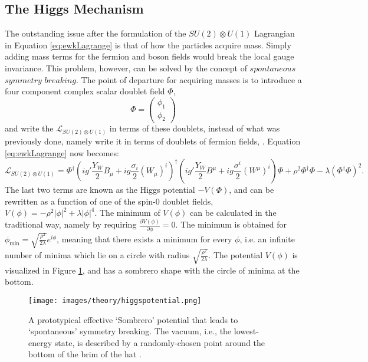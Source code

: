 \subsection*{The Higgs Mechanism}\label{sec:higgs}
\noindent\justify 
The outstanding issue after the formulation of the $SU(2)\otimes U(1)$ Lagrangian in Equation \ref{eq:ewkLagrange} is that of how the particles acquire mass. 
Simply adding mass terms for the fermion and boson fields would break the local gauge invariance. 
This problem, however, can be solved by the concept of $spontaneous$ $symmetry$ $breaking$. 
The point of departure for acquiring masses is to introduce a four component complex scalar doublet field $\Phi$,
\begin{equation}
\Phi=\begin{pmatrix} \phi_{1}\\ \phi_{2}\end{pmatrix}
\end{equation}
and write the $\mathcal{L}_{SU(2)\otimes U(1)}$ in terms of these doublets, instead of what was previously done, namely write it in terms of doublets of fermion fields, \cite{Kane:2244793}.  
Equation \ref{eq:ewkLagrange} now becomes:
\begin{equation}
\mathcal{L}_{SU(2)\otimes U(1)}=
\Phi^{\dagger}\left( ig'\frac{Y_{W}}{2}B_{\mu}+ig\frac{\sigma_{i}}{2}(W_{\mu})^{i}\right)^{\dagger}\left(ig'\frac{Y_{W}}{2}B^{\mu}+ig\frac{\sigma^{i}}{2}(W^{\mu})^{i}\right)\Phi
+\rho^{2}\Phi^{\dagger}\Phi-\lambda(\Phi^{\dagger}\Phi)^{2}. 
\label{eq:higgsPotential}
\end{equation}
The last two terms are known as the Higgs potential $-V(\Phi)$, and can be rewritten as a function of one of the spin-0 doublet fields, $V(\phi)=-\rho^{2}|\phi|^{2}+\lambda|\phi|^{4}$. 
The minimum of $V(\phi)$ can be calculated in the traditional way, namely by requiring $\frac{\partial V(\phi)}{\partial \phi}=0$. 
The minimum is obtained for $\phi_{\mathrm{min}}=\sqrt{\frac{\rho^{2}}{2\lambda}}e^{i\phi}$, meaning that there exists a minimum for every $\phi$, i.e. an infinite number of minima which lie on a circle with radius $\sqrt{\frac{\rho^{2}}{2\lambda}}$.
The potential $V(\phi)$ is visualized in Figure \ref{fig:higgsPotential}, and has a sombrero shape with the circle of minima at the bottom.  
\begin{figure}[htbp!]
\begin{center}
    \texttt{[image: images/theory/higgspotential.png]}
    \caption{A prototypical effective `Sombrero' potential that leads to `spontaneous' symmetry breaking. 
The vacuum, i.e., the lowest-energy state, is described by a randomly-chosen point around the bottom of the brim of the hat \cite{Ellis:2012465}. }
\label{fig:higgsPotential}
\end{center}
\end{figure}
